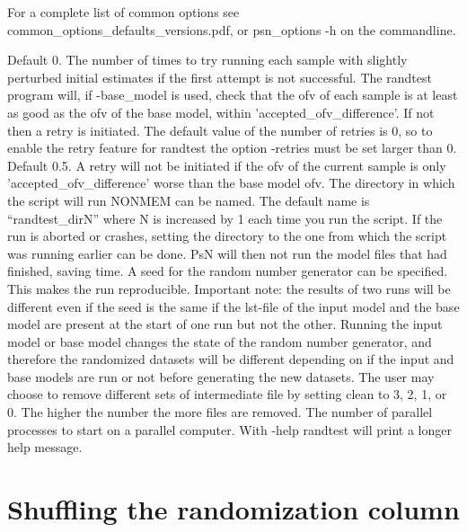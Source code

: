 For a complete list of common options see common\_options\_defaults\_versions.pdf, or psn\_options -h on the commandline.

\begin{optionlist}
Default 0. The number of times to try running each sample with slightly perturbed initial estimates if the first attempt is not successful.
The randtest program will, if -base\_model is used, check that the ofv of each sample is at least as good as the ofv of
the base model, within 'accepted\_ofv\_difference'. If not then a retry is initiated. The default value of the number of
retries is 0, so to enable the retry feature for randtest the option -retries must be set larger than 0. 
\nextopt
{}
Default 0.5. A retry will not be initiated if the ofv of the current sample is only 'accepted\_ofv\_difference' worse than
the base model ofv.
\nextopt
{}
The directory in which the script will run NONMEM can be named. The default name is “randtest\_dirN” where N is increased by 1 each time you run the script. If the run is aborted or crashes, setting the directory to the one from which the script was running earlier can be done. PsN will then not run the model files that had finished, saving time. 
\nextopt
{}
A seed for the random number generator can be specified. This makes the run reproducible. Important note: the results of two runs will be different even if the seed is the same if the lst-file of the input model and the base model are present at the start of one run but not the other. Running the input model or base model changes the state of the random number generator, and therefore the randomized datasets will be different depending on if the input and base models are run or not before generating the  new datasets. 
\nextopt
{}
The user may choose to remove different sets of intermediate file by setting clean to 3, 2, 1, or 0. The higher the number the more files are removed. 
\nextopt
{}
The number of parallel processes to start on a parallel computer. 
\nextopt
{}
With -help randtest will print a longer help message. 
\nextopt
\end{optionlist}

\section{Shuffling the randomization column}

